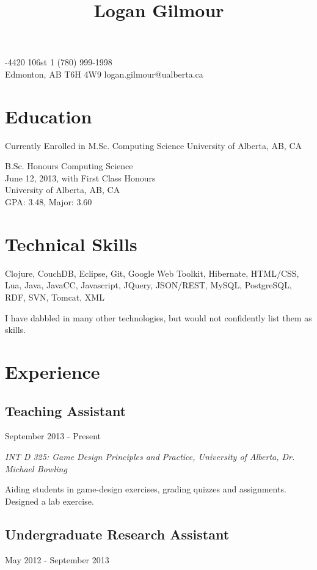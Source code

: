 \documentclass[10pt]{article}
\title{\bfseries\Large Logan Gilmour}
\author{}
\date{}
\begin{document}
\maketitle
{}-4420 106st \hfill 1 (780) 999-1998\\
Edmonton, AB  T6H 4W9 \hfill logan.gilmour@ualberta.ca
\section*{Education}
Currently Enrolled in M.Sc. Computing Science
University of Alberta, AB, CA

B.Sc. Honours Computing Science\\
June 12, 2013, with First Class Honours\\
University of Alberta, AB, CA\\
GPA: 3.48, Major: 3.60

\section*{Technical Skills}
Clojure, CouchDB, Eclipse, Git, Google Web Toolkit, Hibernate, HTML/CSS, Lua, Java, JavaCC, Javascript, JQuery, JSON/REST, MySQL, PostgreSQL, RDF, SVN, Tomcat, XML

\vspace{\baselineskip}

I have dabbled in many other technologies, but would not confidently list them as skills.

\section*{Experience}

\subsection*{Teaching Assistant}
September 2013 - Present

\emph{INT D 325: Game Design Principles and Practice, University of Alberta, Dr. Michael Bowling}
\vspace{\baselineskip}

Aiding students in game-design exercises, grading quizzes and assignments. Designed a lab exercise.

\subsection*{Undergraduate Research Assistant}
May 2012 - September 2013
\end{document}
